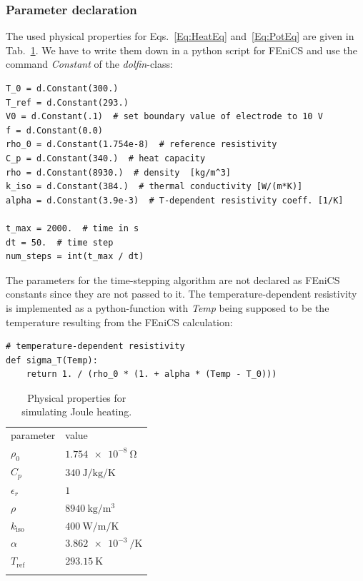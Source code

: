 \documentclass{article}
\begin{document}
\subsubsection{Parameter declaration}
The used physical properties for Eqs.~\eqref{Eq:HeatEq} and~\eqref{Eq:PotEq} are given in Tab.~\ref{tab:1}.
We have to write them down in a python script for FEniCS and use the command \textit{Constant} of the \textit{dolfin}-class:
\begin{lstlisting}
T_0 = d.Constant(300.)
T_ref = d.Constant(293.)
V0 = d.Constant(.1)  # set boundary value of electrode to 10 V
f = d.Constant(0.0)
rho_0 = d.Constant(1.754e-8)  # reference resistivity
C_p = d.Constant(340.)  # heat capacity
rho = d.Constant(8930.)  # density  [kg/m^3]
k_iso = d.Constant(384.)  # thermal conductivity [W/(m*K)]
alpha = d.Constant(3.9e-3)  # T-dependent resistivity coeff. [1/K]

t_max = 2000.  # time in s
dt = 50.  # time step
num_steps = int(t_max / dt)
\end{lstlisting}
The parameters for the time-stepping algorithm are not declared as FEniCS constants since they are not passed to it.
The temperature-dependent resistivity is implemented as a python-function with \textit{Temp} being supposed to be the temperature resulting from the FEniCS calculation:
\begin{lstlisting}
# temperature-dependent resistivity
def sigma_T(Temp):
    return 1. / (rho_0 * (1. + alpha * (Temp - T_0)))
\end{lstlisting}
\begin{table}[!htp]
\caption{Physical properties for simulating Joule heating.}
\label{tab:1} 
\begin{center}
\begin{tabular}{l@{\hskip 8pt}l@{\hskip 8pt}}
\hline\noalign{\smallskip}
parameter & value  \\
\noalign{\smallskip}\hline\noalign{\smallskip}
$\rho_0$& $\SI{1.754e-8}{\ohm}$\\
$C_p$ & $\SI{340}{\J\per\kg\per \K}$\\
$\epsilon_r$ & $1$ \\
$\rho$ & $\SI{8940}{\kg \per \m^3}$\\
$k_{\mathrm{iso}}$ & $\SI{400}{\W\per\m\per\K}$\\
$\alpha$ & $\SI{3.862e-3}{\per\K}$\\
$T_\mathrm{ref}$ & $\SI{293.15}{\K}$\\
\noalign{\smallskip}\hline
\end{tabular}
\end{center}
\end{table}
\end{document}

